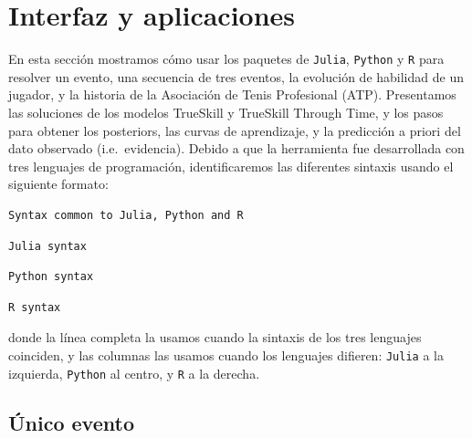 \documentclass[a4paper,11pt]{book}
\theoremstyle{definition}
\begin{document}
\section{Interfaz y aplicaciones} \label{sec:illustrations}

En esta secci\'on mostramos c\'omo usar los paquetes de \texttt{Julia}, \texttt{Python} y \texttt{R} para resolver un evento, una secuencia de tres eventos, la evoluci\'on de habilidad de un jugador, y la historia de la Asociaci\'on de Tenis Profesional (ATP).
%
Presentamos las soluciones de los modelos TrueSkill y TrueSkill Through Time, y los pasos para obtener los posteriors, las curvas de aprendizaje, y la predicci\'on a priori del dato observado (i.e.~evidencia).
%
Debido a que la herramienta fue desarrollada con tres lenguajes de programaci\'on, identificaremos las diferentes sintaxis usando el siguiente formato:
%
\begin{lstlisting}[captionpos=b, backgroundcolor=\color{all}, belowskip=-0.77 \baselineskip,escapechar=|]
Syntax common to Julia, Python and R
\end{lstlisting}
\begin{paracol}{3}
\begin{lstlisting}[backgroundcolor=\color{julia!60}]
Julia syntax
\end{lstlisting}
  \switchcolumn
\begin{lstlisting}[backgroundcolor=\color{python!60}]
Python syntax
\end{lstlisting}
   \switchcolumn
\begin{lstlisting}[backgroundcolor=\color{r!50}]
R syntax
\end{lstlisting}
\end{paracol}
%
donde la l\'inea completa la usamos cuando la sintaxis de los tres lenguajes coinciden, y las columnas las usamos cuando los lenguajes difieren: \texttt{Julia} a la izquierda, \texttt{Python} al centro, y \texttt{R} a la derecha.

\subsection{\'Unico evento} \label{sec:singleEvent}
\end{document}

